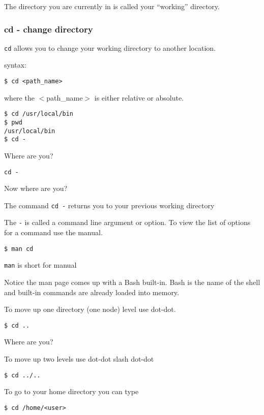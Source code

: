 \documentclass[12pt]{article}
\begin{document}
The directory you are currently in is called your ``working'' directory.

\subsubsection{cd - change directory}
\texttt{cd} allows you to change your working directory to another location.

syntax:

\begin{lstlisting}[style=bash]
$ cd <path_name> 
\end{lstlisting}

where the $<$path\_name$>$ is either relative or absolute.

\begin{lstlisting}[style=bash]
$ cd /usr/local/bin
$ pwd
/usr/local/bin
$ cd -
\end{lstlisting}

Where are you?

\begin{lstlisting}[style=bash]
cd -
\end{lstlisting}

Now where are you?

The command \texttt{cd -} returns you to your previous working directory

The \texttt{-} is called a command line argument or option. To view
the list of options for a command use the manual.

\begin{lstlisting}[style=bash]
$ man cd
\end{lstlisting}

\texttt{man} is short for manual

Notice the man page comes up with a Bash built-in. Bash is the name of
the shell and built-in commands are
already loaded into memory.

To move up one directory (one node) level use dot-dot.

\begin{lstlisting}[style=bash]
$ cd ..
\end{lstlisting}
Where are you?

To move up two levels use dot-dot slash dot-dot
\begin{lstlisting}[style=bash]
$ cd ../..
\end{lstlisting}
 
To go to your home directory you can type
 
\begin{lstlisting}[style=bash]
$ cd /home/<user>
\end{lstlisting}
\end{document}
